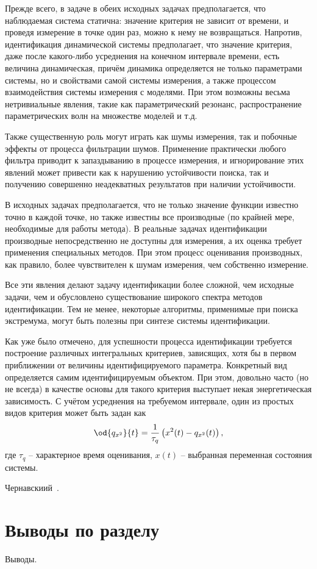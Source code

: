 Прежде всего, в задаче в обеих исходных задачах
предполагается, что наблюдаемая система статична:
значение критерия не зависит от времени, и проведя измерение
в точке один раз, можно к нему не возвращаться.
Напротив, идентификация динамической системы предполагает,
что значение критерия, даже после какого-либо усреднения на конечном
интервале времени, есть величина динамическая, причём динамика определяется
не только параметрами системы, но и свойствами самой системы измерения,
а также процессом взаимодействия системы измерения с моделями. При этом
возможны весьма нетривиальные явления, такие как параметрический
резонанс, распространение параметрических волн на множестве моделей и т.д.

Также существенную роль могут играть как шумы измерения, так и побочные
эффекты от процесса фильтрации шумов.
Применение практически любого фильтра приводит к запаздыванию
в процессе измерения, и игнорирование этих явлений может привести
как к нарушению устойчивости поиска, так и получению совершенно
неадекватных результатов при наличии устойчивости.

В исходных задачах предполагается, что не только
значение функции известно точно в каждой точке, но также известны все производные
(по крайней мере, необходимые для работы метода).
В реальные задачах идентификации производные непосредственно
не доступны для измерения, а их оценка требует применения специальных
методов. При этом процесс оценивания производных, как правило,
более чувствителен к шумам измерения, чем собственно измерение.



Все эти явления делают задачу идентификации более сложной, чем
исходные задачи, чем и обусловлено
существование широкого спектра методов идентификации. Тем не менее,
некоторые алгоритмы, применимые при поиска экстремума, могут быть
полезны при синтезе системы идентификации.

Как уже было отмечено, для успешности процесса идентификации требуется
построение различных интегральных критериев, зависящих,
хотя бы в первом приближении
от величины идентифицируемого параметра. Конкретный вид определяется самим идентифицируемым
объектом. При этом, довольно часто (но не всегда) в качестве основы для такого критерия выступает
некая энергетическая зависимость. С учётом усреднения на требуемом интервале,
один из простых видов критерия может быть задан как
%
\begin{equation}
\od{q_{x^2}}{t}
=
\frac{1}{\tau_q} \left( x^2(t) - q_{x^2}(t) \right)
,
\label{atu:eq:qlin}
\end{equation}
%
где $\tau_q$ -- характерное время оценивания, $x(t)$ -- выбранная переменная состояния системы.

Чернавскиий~\cite{chernavskii_syn_info}.

\section{Выводы по разделу \thechapter}

Выводы.

